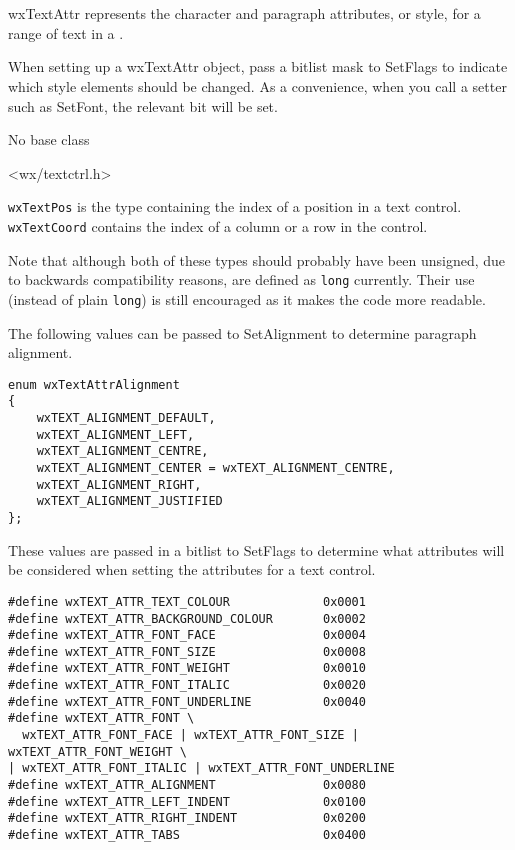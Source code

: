 
\section{}\label{wxtextattr}

wxTextAttr represents the character and paragraph attributes, or style, for a range of text in a\rtfsp
{}.

When setting up a wxTextAttr object, pass a bitlist mask to SetFlags to indicate
which style elements should be changed. As a convenience, when you call a
setter such as SetFont, the relevant bit will be set.


No base class


<wx/textctrl.h>


\texttt{wxTextPos} is the type containing the index of a position in a text
control. \texttt{wxTextCoord} contains the index of a column or a row in the
control.

Note that although both of these types should probably have been unsigned, due
to backwards compatibility reasons, are defined as \texttt{long} currently.
Their use (instead of plain \texttt{long}) is still encouraged as it makes the
code more readable.


The following values can be passed to SetAlignment to determine
paragraph alignment.

{\small
\begin{verbatim}
enum wxTextAttrAlignment
{
    wxTEXT_ALIGNMENT_DEFAULT,
    wxTEXT_ALIGNMENT_LEFT,
    wxTEXT_ALIGNMENT_CENTRE,
    wxTEXT_ALIGNMENT_CENTER = wxTEXT_ALIGNMENT_CENTRE,
    wxTEXT_ALIGNMENT_RIGHT,
    wxTEXT_ALIGNMENT_JUSTIFIED
};
\end{verbatim}
}

These values are passed in a bitlist to SetFlags to determine
what attributes will be considered when setting the attributes
for a text control.

{\small
\begin{verbatim}
#define wxTEXT_ATTR_TEXT_COLOUR             0x0001
#define wxTEXT_ATTR_BACKGROUND_COLOUR       0x0002
#define wxTEXT_ATTR_FONT_FACE               0x0004
#define wxTEXT_ATTR_FONT_SIZE               0x0008
#define wxTEXT_ATTR_FONT_WEIGHT             0x0010
#define wxTEXT_ATTR_FONT_ITALIC             0x0020
#define wxTEXT_ATTR_FONT_UNDERLINE          0x0040
#define wxTEXT_ATTR_FONT \
  wxTEXT_ATTR_FONT_FACE | wxTEXT_ATTR_FONT_SIZE | wxTEXT_ATTR_FONT_WEIGHT \
| wxTEXT_ATTR_FONT_ITALIC | wxTEXT_ATTR_FONT_UNDERLINE
#define wxTEXT_ATTR_ALIGNMENT               0x0080
#define wxTEXT_ATTR_LEFT_INDENT             0x0100
#define wxTEXT_ATTR_RIGHT_INDENT            0x0200
#define wxTEXT_ATTR_TABS                    0x0400
\end{verbatim}
}

